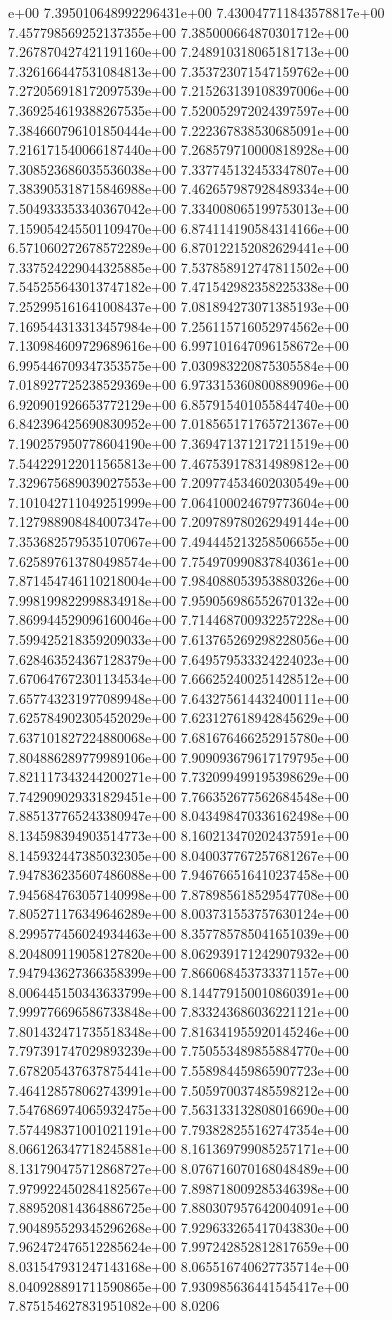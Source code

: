 e+00	7.395010648992296431e+00	7.430047711843578817e+00	7.457798569252137355e+00	7.385000664870301712e+00	7.267870427421191160e+00	7.248910318065181713e+00	7.326166447531084813e+00	7.353723071547159762e+00	7.272056918172097539e+00	7.215263139108397006e+00	7.369254619388267535e+00	7.520052972024397597e+00	7.384660796101850444e+00	7.222367838530685091e+00	7.216171540066187440e+00	7.268579710000818928e+00	7.308523686035536038e+00	7.337745132453347807e+00	7.383905318715846988e+00	7.462657987928489334e+00	7.504933353340367042e+00	7.334008065199753013e+00	7.159054245501109470e+00	6.874114190584314166e+00	6.571060272678572289e+00	6.870122152082629441e+00	7.337524229044325885e+00	7.537858912747811502e+00	7.545255643013747182e+00	7.471542982358225338e+00	7.252995161641008437e+00	7.081894273071385193e+00	7.169544313313457984e+00	7.256115716052974562e+00	7.130984609729689616e+00	6.997101647096158672e+00	6.995446709347353575e+00	7.030983220875305584e+00	7.018927725238529369e+00	6.973315360800889096e+00	6.920901926653772129e+00	6.857915401055844740e+00	6.842396425690830952e+00	7.018565171765721367e+00	7.190257950778604190e+00	7.369471371217211519e+00	7.544229122011565813e+00	7.467539178314989812e+00	7.329675689039027553e+00	7.209774534602030549e+00	7.101042711049251999e+00	7.064100024679773604e+00	7.127988908484007347e+00	7.209789780262949144e+00	7.353682579535107067e+00	7.494445213258506655e+00	7.625897613780498574e+00	7.754970990837840361e+00	7.871454746110218004e+00	7.984088053953880326e+00	7.998199822998834918e+00	7.959056986552670132e+00	7.869944529096160046e+00	7.714468700932257228e+00	7.599425218359209033e+00	7.613765269298228056e+00	7.628463524367128379e+00	7.649579533324224023e+00	7.670647672301134534e+00	7.666252400251428512e+00	7.657743231977089948e+00	7.643275614432400111e+00	7.625784902305452029e+00	7.623127618942845629e+00	7.637101827224880068e+00	7.681676466252915780e+00	7.804886289779989106e+00	7.909093679617179795e+00	7.821117343244200271e+00	7.732099499195398629e+00	7.742909029331829451e+00	7.766352677562684548e+00	7.885137765243380947e+00	8.043498470336162498e+00	8.134598394903514773e+00	8.160213470202437591e+00	8.145932447385032305e+00	8.040037767257681267e+00	7.947836235607486088e+00	7.946766516410237458e+00	7.945684763057140998e+00	7.878985618529547708e+00	7.805271176349646289e+00	8.003731553757630124e+00	8.299577456024934463e+00	8.357785785041651039e+00	8.204809119058127820e+00	8.062939171242907932e+00	7.947943627366358399e+00	7.866068453733371157e+00	8.006445150343633799e+00	8.144779150010860391e+00	7.999776696586733848e+00	7.833243686036221121e+00	7.801432471735518348e+00	7.816341955920145246e+00	7.797391747029893239e+00	7.750553489855884770e+00	7.678205437637875441e+00	7.558984459865907723e+00	7.464128578062743991e+00	7.505970037485598212e+00	7.547686974065932475e+00	7.563133132808016690e+00	7.574498371001021191e+00	7.793828255162747354e+00	8.066126347718245881e+00	8.161369799085257171e+00	8.131790475712868727e+00	8.076716070168048489e+00	7.979922450284182567e+00	7.898718009285346398e+00	7.889520814364886725e+00	7.880307957642004091e+00	7.904895529345296268e+00	7.929633265417043830e+00	7.962472476512285624e+00	7.997242852812817659e+00	8.031547931247143168e+00	8.065516740627735714e+00	8.040928891711590865e+00	7.930985636441545417e+00	7.875154627831951082e+00	8.0206